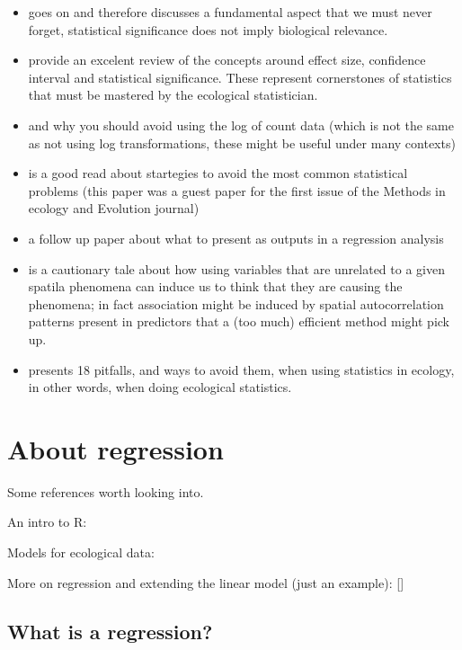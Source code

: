\documentclass[
]{book}
\begin{document}
\begin{itemize}
\item
  \citet{Martinez-Abrain2008} goes on and therefore discusses a fundamental aspect that we must never forget, statistical significance does not imply biological relevance.
\item
  \citet{Nakagawa2007} provide an excelent review of the concepts around effect size, confidence interval and statistical significance. These represent cornerstones of statistics that must be mastered by the ecological statistician.
\item
  \citet{OHara2010} and why you should avoid using the log of count data (which is not the same as not using log transformations, these might be useful under many contexts)
\item
  \citet{Zuur2009} is a good read about startegies to avoid the most common statistical problems (this paper was a guest paper for the first issue of the Methods in ecology and Evolution journal)
\item
  \citet{Zuur2016} a follow up paper about what to present as outputs in a regression analysis
\item
  \citet{Fourcade2017} is a cautionary tale about how using variables that are unrelated to a given spatila phenomena can induce us to think that they are causing the phenomena; in fact association might be induced by spatial autocorrelation patterns present in predictors that a (too much) efficient method might pick up.
\item
  \citet{Steel2013} presents 18 pitfalls, and ways to avoid them, when using statistics in ecology, in other words, when doing ecological statistics.
\end{itemize}

\chapter{About regression}\label{about-regression}

Some references worth looking into.

An intro to R: \citep{Zuur2009a}

Models for ecological data: \citep{Zuur2007}

More on regression and extending the linear model (just an example): {[}\citet{Faraway2006}{]}\citep{Zuur2009b}

\section{What is a regression?}\label{what-is-a-regression}
\end{document}
